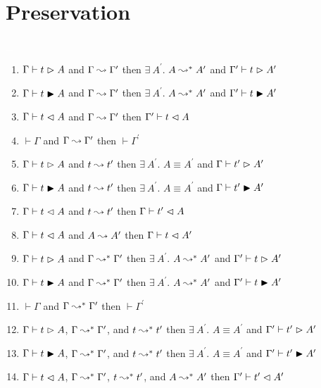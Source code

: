 \section{Preservation}

\begin{theorem}
    \textcolor{white}{\_}
    \begin{enumerate}
        \item $\Gamma \vdash t \vartriangleright A$ and $\Gamma \leadsto \Gamma^\prime$ then $\exists\ A^\prime.$ $A \leadsto^* A^\prime$ and $\Gamma^\prime \vdash t \vartriangleright A^\prime$
        \item $\Gamma \vdash t \blacktriangleright A$ and $\Gamma \leadsto \Gamma^\prime$ then $\exists\ A^\prime.$ $A \leadsto^* A^\prime$ and $\Gamma^\prime \vdash t \blacktriangleright A^\prime$
        \item $\Gamma \vdash t \vartriangleleft A$ and $\Gamma \leadsto \Gamma^\prime$ then $\Gamma^\prime \vdash t \vartriangleleft A$
        \item $\vdash \Gamma$ and $\Gamma \leadsto \Gamma^\prime$ then $\vdash \Gamma^\prime$
        \item $\Gamma \vdash t \vartriangleright A$ and $t \leadsto t^\prime$ then $\exists\ A^\prime.$ $A \equiv A^\prime$ and $\Gamma \vdash t^\prime \vartriangleright A^\prime$
        \item $\Gamma \vdash t \blacktriangleright A$ and $t \leadsto t^\prime$ then $\exists\ A^\prime.$ $A \equiv A^\prime$ and $\Gamma \vdash t^\prime \blacktriangleright A^\prime$
        \item $\Gamma \vdash t \vartriangleleft A$ and $t \leadsto t^\prime$ then $\Gamma \vdash t^\prime \vartriangleleft A$
        \item $\Gamma \vdash t \vartriangleleft A$ and $A \leadsto A^\prime$ then $\Gamma \vdash t \vartriangleleft A^\prime$
        \item $\Gamma \vdash t \vartriangleright A$ and $\Gamma \leadsto^* \Gamma^\prime$ then $\exists\ A^\prime.$ $A \leadsto^* A^\prime$ and $\Gamma^\prime \vdash t \vartriangleright A^\prime$
        \item $\Gamma \vdash t \blacktriangleright A$ and $\Gamma \leadsto^* \Gamma^\prime$ then $\exists\ A^\prime.$ $A \leadsto^* A^\prime$ and $\Gamma^\prime \vdash t \blacktriangleright A^\prime$
        \item $\vdash \Gamma$ and $\Gamma \leadsto^* \Gamma^\prime$ then $\vdash \Gamma^\prime$
        \item $\Gamma \vdash t \vartriangleright A$, $\Gamma \leadsto^* \Gamma^\prime$, and $t \leadsto^* t^\prime$ then $\exists\ A^\prime.$ $A \equiv A^\prime$ and $\Gamma^\prime \vdash t^\prime \vartriangleright A^\prime$
        \item $\Gamma \vdash t \blacktriangleright A$, $\Gamma \leadsto^* \Gamma^\prime$, and $t \leadsto^* t^\prime$ then $\exists\ A^\prime.$ $A \equiv A^\prime$ and $\Gamma^\prime \vdash t^\prime \blacktriangleright A^\prime$
        \item $\Gamma \vdash t \vartriangleleft A$, $\Gamma \leadsto^* \Gamma^\prime$, $t \leadsto^* t^\prime$, and $A \leadsto^* A^\prime$ then $\Gamma^\prime \vdash t^\prime \vartriangleleft A^\prime$
    \end{enumerate}
\end{theorem}
